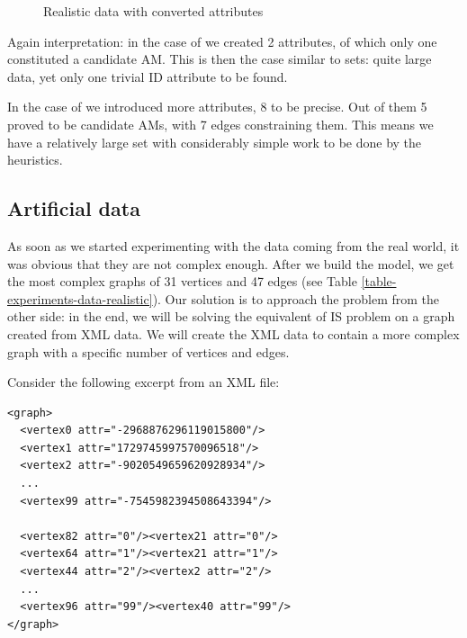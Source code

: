 \begin{figure}
  \caption{Realistic data with converted attributes}
  \label{image-experiments-data-converted}
  \centering
\end{figure}

Again interpretation: in the case of  we created 2 attributes, of which only one constituted a candidate AM. This is then the case similar to  sets: quite large data, yet only one trivial ID attribute to be found.

In the case of  we introduced more attributes, 8 to be precise. Out of them 5 proved to be candidate AMs, with 7 edges constraining them. This means we have a relatively large set with considerably simple work to be done by the heuristics.

\subsection{Artificial data}

As soon as we started experimenting with the data coming from the real world, it was obvious that they are not complex enough. After we build the model, we get the most complex graphs of 31 vertices and 47 edges (see Table \ref{table-experiments-data-realistic}). Our solution is to approach the problem from the other side: in the end, we will be solving the equivalent of IS problem on a graph created from XML data. We will create the XML data to contain a more complex graph with a specific number of vertices and edges.

Consider the following excerpt from an XML file:

\begin{scriptsize}
\begin{verbatim}
<graph>
  <vertex0 attr="-2968876296119015800"/>
  <vertex1 attr="1729745997570096518"/>
  <vertex2 attr="-9020549659620928934"/>
  ...
  <vertex99 attr="-7545982394508643394"/>

  <vertex82 attr="0"/><vertex21 attr="0"/>
  <vertex64 attr="1"/><vertex21 attr="1"/>
  <vertex44 attr="2"/><vertex2 attr="2"/>
  ...
  <vertex96 attr="99"/><vertex40 attr="99"/>
</graph>
\end{verbatim}
\end{scriptsize}

